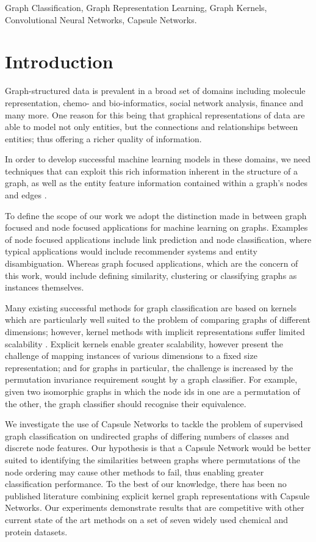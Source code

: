\documentclass[conference]{IEEEtran}
\begin{document}
\begin{IEEEkeywords}
Graph Classification, Graph Representation Learning, Graph Kernels, Convolutional Neural Networks, Capsule Networks.
\end{IEEEkeywords}

\section{Introduction}
Graph-structured data is prevalent in a broad set of domains including molecule representation, chemo- and bio-informatics, social network analysis, finance and many more. One reason for this being that graphical representations of data are able to model not only entities, but the connections and relationships between entities; thus offering a richer quality of information.

In order to develop successful machine learning models in these domains, we need techniques that can exploit this rich information inherent in the structure of a graph, as well as the entity feature information contained within a graph's nodes and edges \cite{morris2017glocalized}.

To define the scope of our work we adopt the distinction made in \cite{scarselli2009graph} between graph focused and node focused applications for machine learning on graphs. Examples of node focused applications include link prediction and node classification, where typical applications would include recommender systems and entity disambiguation. Whereas graph focused applications, which are the concern of this work, would include defining similarity, clustering or classifying graphs as instances themselves.

Many existing successful methods for graph classification are based on kernels \cite{kashima2002kernels} which are particularly well suited to the problem of comparing graphs of different dimensions; however, kernel methods with implicit representations suffer limited scalability \cite{kriege2014explicit}. Explicit kernels enable greater scalability, however present the challenge of mapping instances of various dimensions to a fixed size representation; and for graphs in particular, the challenge is increased by the permutation invariance requirement sought by a graph classifier. For example, given two isomorphic graphs in which the node ids in one are a permutation of the other, the graph classifier should recognise their equivalence.

We investigate the use of Capsule Networks \cite{sabour2017dynamic} to tackle the problem of supervised graph classification on undirected graphs of differing numbers of classes and discrete node features. Our hypothesis is that a Capsule Network would be better suited to identifying the similarities between graphs where permutations of the node ordering may cause other methods to fail, thus enabling greater classification performance. To the best of our knowledge, there has been no published literature combining explicit kernel graph representations with Capsule Networks. Our experiments demonstrate results that are competitive with other current state of the art methods on a set of seven widely used chemical and protein datasets.
\end{document}

